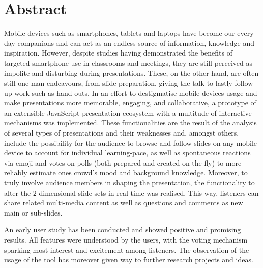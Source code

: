 \chapter{Abstract}
Mobile devices such as smartphones, tablets and laptops have become our every day companions and can act as an endless source of information, knowledge and inspiration. However, despite studies having demonstrated the benefits of targeted smartphone use in classrooms and meetings, they are still perceived as impolite and disturbing during presentations. These, on the other hand, are often still one-man endeavours, from slide preparation, giving the talk to lastly follow-up work such as hand-outs. In an effort to destigmatise mobile devices usage and make presentations more memorable, engaging, and collaborative, a prototype of an extensible JavaScript presentation eco\-system with a multitude of interactive mechanisms was implemented. These functionalities are the result of the analysis of several types of presentations and their weaknesses and, amongst others, include the possibility for the audience to browse and follow slides on any mobile device to account for individual learning-pace, as well as spontaneous reactions via emoji and votes on polls (both prepared and created on-the-fly) to more reliably estimate ones crowd's mood and background knowledge. Moreover, to truly involve audience members in shaping the presentation, the functionality to alter the $2$-dimensional slide-sets in real time was realised. This way, listeners can share related multi-media content as well as questions and comments as new main or sub-slides.

An early user study has been conducted and showed positive and promising results. All features were understood by the users, with the voting mechanism sparking most interest and excitement among listeners. The observation of the usage of the tool has moreover given way to further research projects and ideas. 